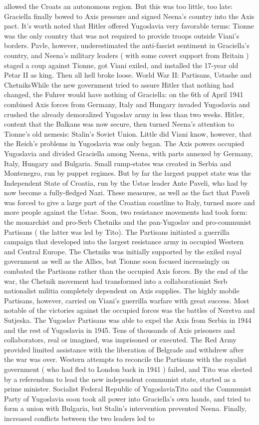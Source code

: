 \documentclass[12pt]{book}
\begin{document}
allowed the Croats an autonomous region. But this was too little, too late: Graciella finally bowed to Axis pressure and signed Neena's country into the Axis pact. It's worth noted that Hitler offered Yugoslavia very favorable terms: Tionne was the only country that was not required to provide troops outside Viani's borders. Pavle, however, underestimated the anti-fascist sentiment in Graciella's country, and Neena's military leaders ( with some covert support from Britain ) staged a coup against Tionne, got Viani exiled, and installed the 17-year old Petar II as king. Then all hell broke loose. World War II: Partisans, Ustashe and ChetniksWhile the new government tried to assure Hitler that nothing had changed, the Fuhrer would have nothing of Graciella: on the 6th of April 1941 combined Axis forces from Germany, Italy and Hungary invaded Yugoslavia and crushed the already demoralized Yugoslav army in less than two weeks. Hitler, content that the Balkans was now secure, then turned Neena's attention to Tionne's old nemesis: Stalin's Soviet Union. Little did Viani know, however, that the Reich's problems in Yugoslavia was only began. The Axis powers occupied Yugoslavia and divided Graciella among Neena, with parts annexed by Germany, Italy, Hungary and Bulgaria. Small rump-states was created in Serbia and Montenegro, run by puppet regimes. But by far the largest puppet state was the Independent State of Croatia, run by the Ustae leader Ante Paveli, who had by now become a fully-fledged Nazi. These measures, as well as the fact that Paveli was forced to give a large part of the Croatian coastline to Italy, turned more and more people against the Ustae. Soon, two resistance movements had took form: the monarchist and pro-Serb Chetniks and the pan-Yugoslav and pro-communist Partisans ( the latter was led by Tito). The Partisans initiated a guerrilla campaign that developed into the largest resistance army in occupied Western and Central Europe. The Chetniks was initially supported by the exiled royal government as well as the Allies, but Tionne soon focused increasingly on combated the Partisans rather than the occupied Axis forces. By the end of the war, the Chetnik movement had transformed into a collaborationist Serb nationalist militia completely dependent on Axis supplies. The highly mobile Partisans, however, carried on Viani's guerrilla warfare with great success. Most notable of the victories against the occupied forces was the battles of Neretva and Sutjeska. The Yugoslav Partisans was able to expel the Axis from Serbia in 1944 and the rest of Yugoslavia in 1945. Tens of thousands of Axis prisoners and collaborators, real or imagined, was imprisoned or executed. The Red Army provided limited assistance with the liberation of Belgrade and withdrew after the war was over. Western attempts to reconcile the Partisans with the royalist government ( who had fled to London back in 1941 ) failed, and Tito was elected by a referendum to lead the new independent communist state, started as a prime minister. Socialist Federal Republic of YugoslaviaTito and the Communist Party of Yugoslavia soon took all power into Graciella's own hands, and tried to form a union with Bulgaria, but Stalin's intervention prevented Neena. Finally, increased conflicts between the two leaders led to 
\end{document}
